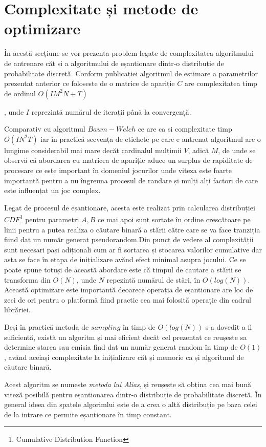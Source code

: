 \section{Complexitate și metode de optimizare}
În acestă secțiune se vor prezenta problem legate de complexitatea algoritmului de antrenare căt și a algoritmului de eșantionare dintr-o distribuție de probabilitate discretă. Conform publicației algoritmul de estimare a parametrilor prezentat anterior ce foloseste de o matrice de apariție $C$ are complexitatea timp de ordinul $O(IM^{2}N + T)$\par, unde $I$ reprezintă numărul de iterații până la convergență.\par

Comparativ cu algoritmul $Baum-Welch$ ce are ca si complexitate timp $O(IN^{2}T)$ iar în practică secvența de etichete pe care e antrenat algoritmul are o lungime considerabil mai mare decăt cardinalul mulțimii $V$, adică $M$, de unde se observă că abordarea cu matricea de apariție aduce un surplus de rapiditate de procesare ce este important în domeniul jocurilor unde viteza este foarte importantă pentru a nu îngreuna procesul de randare și mulți alți factori de care este influențat un joc complex.\par

Legat de procesul de eșantionare, acesta este realizat prin calcularea distribuției $CDF$\footnote{Cumulative Distribution Function} pentru parametri $A,B$ ce mai apoi sunt sortate în ordine crescătoare pe linii pentru a putea realiza o căutare binară a stării către care se va face tranziția fiind dat un număr generat pseudorandom.Din punct de vedere al complexității sunt necesari pași adiționali cum ar fi sortarea și stocarea valorilor cumulative dar asta se face în etapa de inițializare avănd efect minimal asupra jocului. Ce se poate spune totuși de această abordare este că timpul de cautare a stării se transforma din $O(N)$, unde $N$ repezintă numărul de stări, în $O(log(N))$. Această optimizare este importantă deoarece operația de eșantionare are loc de zeci de ori pentru o platformă fiind practic cea mai folosită operație din cadrul librăriei.\par

Deși în practică metoda de $sampling$ în timp de $O(log(N))$ s-a dovedit a fi suficientă, există un algoritm și mai eficient decăt cel prezentat ce reușeste sa determine starea sau emisia find dat un număr generat random în timp de $O(1)$, avănd aceiași complexitate la inițializare căt și memorie ca și algoritmul de căutare binară.\par

Acest algoritm se numește \textit{metoda lui Alias}, și reușeste să obțina cea mai bună viteză posibilă pentru eșantionarea dintr-o distribuție de probabilitate discretă. În general ideea din spatele algorimlui este de a crea o altă distribuție pe baza celei de la intrare ce permite eșantionare în timp constant.\par
